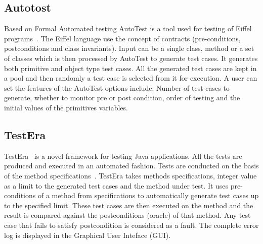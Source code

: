 {%

\subsection{Autotost}
Based on Formal Automated testing AutoTest is a tool used for testing of Eiffel programs~\cite{Ciupa2007}. The Eiffel language use the concept of contracts (pre-conditions, postconditions and class invariants). Input can be a single class, method or a set of classes which is then processed by AutoTest to generate test cases. It generates both primitive and object type test cases. All the generated test cases are kept in a pool and then randomly a test case is selected from it for execution. A user can set the features of the AutoTest options include: Number of test cases to generate, whether to monitor pre or post condition, order of testing and the initial values of the primitives variables.

\subsection{TestEra}
TestEra~\cite{Khurshid2004} is a novel framework for testing Java applications. All the tests are produced and executed in an automated fashion. Tests are conducted on the basis of the method specifications~\cite{Chang1999}. TestEra takes methods specifications, integer value as a limit to the generated test cases and the method under test. It uses pre-conditions of a method from specifications to automatically generate test cases up to the specified limit. These test cases are then executed on the method and the result is compared against the postconditions (oracle) of that method. Any test case that fails to satisfy postcondition is considered as a fault. The complete error log is displayed in the Graphical User Inteface (GUI).

}
